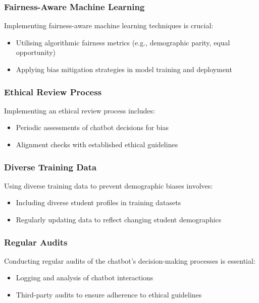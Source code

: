 \documentclass[14pt,a4paper]{article}
\begin{document}
\begin{multicols}{2}
\subsubsection{Fairness-Aware Machine Learning}
Implementing fairness-aware machine learning techniques \textit{\parencite{Barocas2021}} is crucial:
\begin{itemize}
    \item Utilising algorithmic fairness metrics (e.g., demographic parity, equal opportunity)
    \item Applying bias mitigation strategies in model training and deployment
\end{itemize}
\subsubsection*{Ethical Review Process}
Implementing an ethical review process \textit{\parencite{FloridiCowls2023}} includes:
\begin{itemize}
    \item Periodic assessments of chatbot decisions for bias
    \item Alignment checks with established ethical guidelines
\end{itemize}

\subsubsection{Diverse Training Data}
Using diverse training data to prevent demographic biases \textit{\parencite[pp. 1-35]{Mehrabi2023}} involves:
\begin{itemize}
    \item Including diverse student profiles in training datasets
    \item Regularly updating data to reflect changing student demographics
\end{itemize}

\subsubsection{Regular Audits}
Conducting regular audits of the chatbot's decision-making processes \textit{\parencite{AIEthicsGuidelines2024}} is essential:
\begin{itemize}
    \item Logging and analysis of chatbot interactions
    \item Third-party audits to ensure adherence to ethical guidelines
\end{itemize}


\end{multicols}
\end{document}
